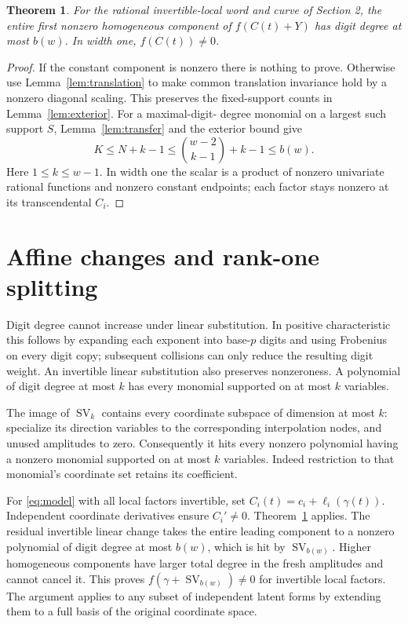 \documentclass[11pt]{article}
\newtheorem{theorem}{Theorem}[section]
\newcommand{\SV}{\operatorname{SV}}
\begin{document}
\begin{theorem}\label{thm:component}
For the rational invertible-local word and curve of Section 2, the
entire first nonzero homogeneous component of $f(C(t)+Y)$ has digit
degree at most $b(w)$. In width one, $f(C(t))\ne0$.
\end{theorem}
\begin{proof}
If the constant component is nonzero there is nothing to prove.
Otherwise use Lemma~\ref{lem:translation} to make common translation
invariance hold by a nonzero diagonal scaling. This preserves the
fixed-support counts in Lemma~\ref{lem:exterior}. For a maximal-digit-
degree monomial on a largest such support $S$, Lemma~\ref{lem:transfer}
and the exterior bound give
\[
 K\le N+k-1\le\binom{w-2}{k-1}+k-1\le b(w).
\]
Here $1\le k\le w-1$. In width one the scalar is a product of
nonzero univariate rational functions and nonzero constant endpoints;
each factor stays nonzero at its transcendental $C_i$.
\end{proof}

\section{Affine changes and rank-one splitting}

Digit degree cannot increase under linear substitution. In positive
characteristic this follows by expanding each exponent into base-$p$
digits and using Frobenius on every digit copy; subsequent collisions
can only reduce the resulting digit weight. An invertible linear
substitution also preserves nonzeroness. A polynomial of digit degree
at most $k$ has every monomial supported on at most $k$ variables.

The image of $\SV_k$ contains every coordinate subspace of dimension
at most $k$: specialize its direction variables to the corresponding
interpolation nodes, and unused amplitudes to zero. Consequently it
hits every nonzero polynomial having a nonzero monomial supported on
at most $k$ variables. Indeed restriction to that monomial's coordinate
set retains its coefficient.

For \eqref{eq:model} with all local factors invertible, set
$C_i(t)=c_i+\ell_i(\gamma(t))$. Independent coordinate derivatives
ensure $C_i'\ne0$. Theorem~\ref{thm:component} applies. The residual
invertible linear change takes the entire leading component to a
nonzero polynomial of digit degree at most $b(w)$, which is hit by
$\SV_{b(w)}$. Higher homogeneous components have larger total degree
in the fresh amplitudes and cannot cancel it. This proves
$f(\gamma+\SV_{b(w)})\ne0$ for invertible local factors.
The argument applies to any subset of independent latent forms by
extending them to a full basis of the original coordinate space.
\end{document}
